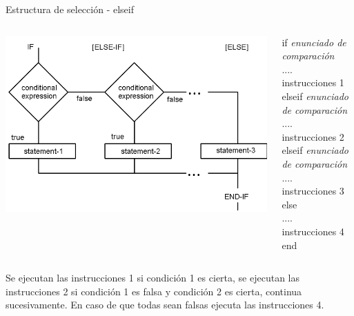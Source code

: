 \documentclass{bredelebeamer}
\begin{document}
\begin{frame}{Estructura de selección - elseif}
\begin{columns}
\begin{column}{0.5\textwidth}
\begin{center}
\includegraphics[scale=0.2]{images/pantalla6.png}
\end{center}
\end{column}
\begin{column}{0.3\textwidth}
if \textit{enunciado de comparación}\\
	....\\
    instrucciones 1\\
elseif \textit{enunciado de comparación}\\
 	....\\
    instrucciones 2\\
elseif \textit{enunciado de comparación}\\
 	....\\
    instrucciones 3\\
else\\
 	....\\
    instrucciones 4\\
end
\end{column}
\end{columns}
Se ejecutan las instrucciones 1 si condición 1 es cierta, se ejecutan las instrucciones 2 si condición 1 es falsa y condición 2 es cierta, continua sucesivamente. En caso de que todas sean falsas ejecuta las instrucciones 4.
\end{frame}
\end{document}
